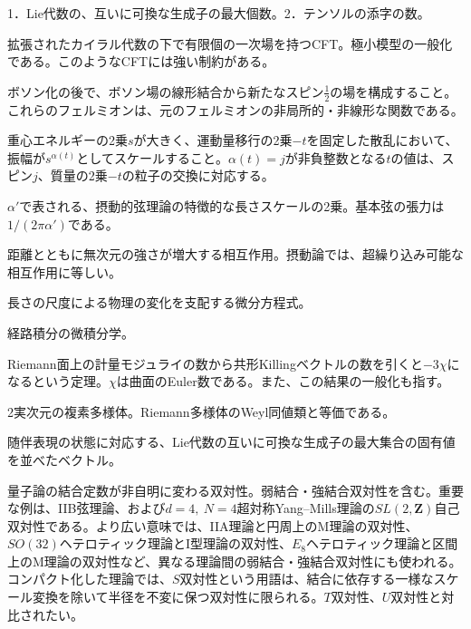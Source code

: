 {1．Lie代数の、互いに可換な生成子の最大個数。2．テンソルの添字の数。}

{拡張されたカイラル代数の下で有限個の一次場を持つCFT。極小模型の一般化である。このようなCFTには強い制約がある。}

{ボソン化の後で、ボソン場の線形結合から新たなスピン$\frac12$の場を構成すること。これらのフェルミオンは、元のフェルミオンの非局所的・非線形な関数である。}

{重心エネルギーの2乗$s$が大きく、運動量移行の2乗$-t$を固定した散乱において、振幅が$s^{\alpha(t)}$としてスケールすること。$\alpha(t)=j$が非負整数となる$t$の値は、スピン$j$、質量の2乗$-t$の粒子の交換に対応する。}

{$\alpha'$で表される、摂動的弦理論の特徴的な長さスケールの2乗。基本弦の張力は$1/(2\pi\alpha')$である。}

{距離とともに無次元の強さが増大する相互作用。摂動論では、超繰り込み可能な相互作用に等しい。}

{長さの尺度による物理の変化を支配する微分方程式。}

{経路積分の微積分学。}

{Riemann面上の計量モジュライの数から共形Killingベクトルの数を引くと$-3\chi$になるという定理。$\chi$は曲面のEuler数である。また、この結果の一般化も指す。}

{2実次元の複素多様体。Riemann多様体のWeyl同値類と等価である。}

{随伴表現の状態に対応する、Lie代数の互いに可換な生成子の最大集合の固有値を並べたベクトル。}

{量子論の結合定数が非自明に変わる双対性。弱結合・強結合双対性を含む。重要な例は、IIB弦理論、および$d=4,\ N=4$超対称Yang--Mills理論の$SL(2,\mathbf Z)$自己双対性である。より広い意味では、IIA理論と円周上のM理論の双対性、$SO(32)$ヘテロティック理論とI型理論の双対性、$E_8$ヘテロティック理論と区間上のM理論の双対性など、異なる理論間の弱結合・強結合双対性にも使われる。コンパクト化した理論では、$S$双対性という用語は、結合に依存する一様なスケール変換を除いて半径を不変に保つ双対性に限られる。$T$双対性、$U$双対性と対比されたい。}

